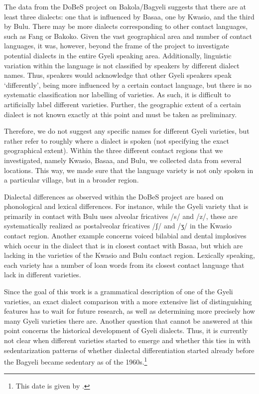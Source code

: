 The data from the DoBeS project on Bakola/Bagyeli suggests that there are at least three dialects: one that is influenced by Basaa, one by Kwasio, and the third by Bulu. There may be more dialects corresponding to other contact languages, such as Fang or Bakoko. Given the vast geographical area and number of contact languages, it was, however, beyond the frame of the project to investigate potential dialects in the entire Gyeli speaking area. Additionally, linguistic variation within the language is not classified by speakers by different dialect names. Thus, speakers would acknowledge that other Gyeli speakers speak `differently', being more influenced by a certain contact language, but there is no systematic classification nor labelling of varieties. 
As such, it is difficult to artificially label different varieties. Further, the geographic extent of a certain dialect is not  known exactly at this point and must be taken as preliminary.

Therefore, we do not suggest any specific names for different Gyeli varieties, but rather refer to roughly where a dialect is  spoken (not specifying the exact geographical extent). Within the three different contact regions that we investigated, namely Kwasio, Basaa, and Bulu, we collected data from several locations. This way, we made sure that the language variety is not only spoken in a particular village, but in a broader region.

Dialectal differences as observed within the DoBeS project are based on phonological and lexical differences. For instance, while the Gyeli variety that is primarily in contact with Bulu uses alveolar fricatives /s/ and /z/, these are systematically realized as postalveolar fricatives /ʃ/ and /ʒ/ in the Kwasio contact region. Another example concerns voiced bilabial and dental implosives which occur in the dialect that is in closest contact with Basaa, but which are lacking in the varieties of the Kwasio and Bulu contact region. Lexically speaking, each variety has a number of loan words from its closest contact language that lack in different varieties.

Since the goal of this work is a grammatical description of one of the Gyeli varieties, an
exact dialect comparison with a more extensive list of distinguishing features has to wait for future research, as well as determining more precisely how many Gyeli varieties there are. Another question that cannot be answered at this point concerns the historical development of Gyeli dialects. Thus, it is currently not clear when different varieties started to emerge and whether this ties in with sedentarization patterns of whether dialectal differentiation started already before the Bagyeli became sedentary as of the 1960s.\footnote{This date is given by \citet[25]{renaud76}.}



